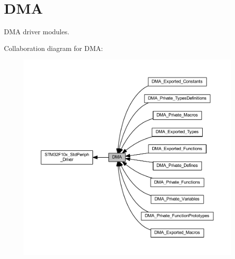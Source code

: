 \hypertarget{group___d_m_a}{}\section{D\+MA}
\label{group___d_m_a}


D\+MA driver modules.  


Collaboration diagram for D\+MA\+:
\nopagebreak
\begin{figure}[H]
\begin{center}
\leavevmode
\includegraphics[width=350pt]{group___d_m_a}
\end{center}
\end{figure}
